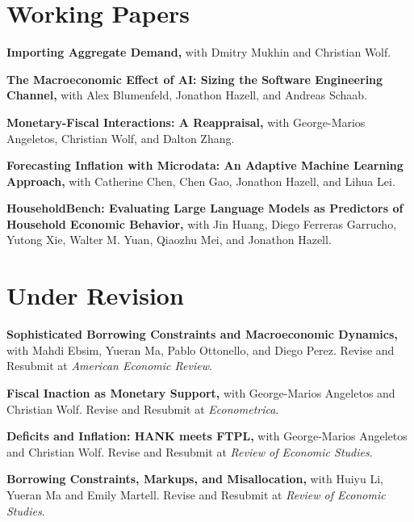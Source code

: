 \documentclass[line]{res}
\newenvironment{list1}{
  \begin{list}{\ding{113}}{%
      \setlength{\itemsep}{0.07in}
      \setlength{\parsep}{0in} \setlength{\parskip}{0in}
		\setlength{\topsep}{0.07in} \setlength{\partopsep}{0in}
      \setlength{\leftmargin}{0.0in}}}{\end{list}}
\begin{document}
\begin{resume}
\section{\sc Working Papers} 
\begin{list1}
\item[] \textbf{Importing Aggregate Demand,} with Dmitry Mukhin and Christian Wolf.
\vspace{0.2cm}
\item[] \textbf{The Macroeconomic Effect of AI: Sizing the Software Engineering Channel,} with Alex Blumenfeld, Jonathon Hazell, and Andreas Schaab.
\vspace{0.2cm}
\item[] \textbf{Monetary-Fiscal Interactions: A Reappraisal,} with George-Marios Angeletos, Christian Wolf, and Dalton Zhang.
\vspace{0.2cm}
\item[] \textbf{Forecasting Inflation with Microdata: An Adaptive Machine Learning Approach,} with Catherine Chen, Chen Gao, Jonathon Hazell, and Lihua Lei.
\vspace{0.2cm}
\item[] \textbf{HouseholdBench: Evaluating Large Language Models as Predictors of Household Economic Behavior,} with Jin Huang, Diego Ferreras Garrucho, Yutong Xie, Walter M. Yuan, Qiaozhu Mei, and Jonathon Hazell.

\end{list1}

\section{\sc Under Revision}
\begin{list1}
\item[] \textbf{Sophisticated Borrowing Constraints and Macroeconomic Dynamics,} with Mahdi Ebsim, Yueran Ma, Pablo Ottonello, and Diego Perez. Revise and Resubmit at \emph{American Economic Review}.
\vspace{0.2cm}
\item[] \textbf{Fiscal Inaction as Monetary Support,} with George-Marios Angeletos and Christian Wolf. Revise and Resubmit at \emph{Econometrica}.
\vspace{0.2cm}
\item[] \textbf{Deficits and Inflation: HANK meets FTPL,} with George-Marios Angeletos and Christian Wolf. Revise and Resubmit at \emph{Review of Economic Studies}.
\vspace{0.2cm}
\item[] \textbf{Borrowing Constraints, Markups, and Misallocation,} with Huiyu Li, Yueran Ma and Emily Martell. Revise and Resubmit at \emph{Review of Economic Studies}.
\end{list1}


\end{resume}
\end{document}

